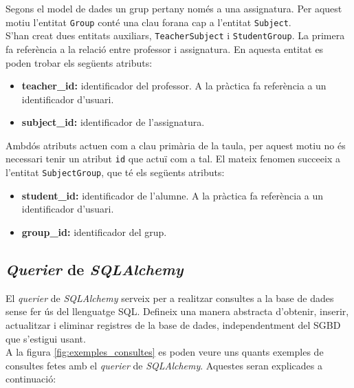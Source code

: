    	Segons el model de dades un grup pertany només a una assignatura. Per aquest motiu l'entitat \texttt{Group} conté una clau forana cap a l'entitat \texttt{Subject}.\\
   	
   	S'han creat dues entitats auxiliars, \texttt{TeacherSubject} i \texttt{StudentGroup}. La primera fa referència a la relació entre professor i assignatura. En aquesta entitat es poden trobar els següents atributs:
   	
   	\begin{itemize}
   		\item \textbf{teacher\_id:} identificador del professor. A la pràctica fa referència a un identificador d'usuari.
   		\item \textbf{subject\_id:} identificador de l'assignatura.
   	\end{itemize}
   	
   	Ambdós atributs actuen com a clau primària de la taula, per aquest motiu no és necessari tenir un atribut \texttt{id} que actuï com a tal. El mateix fenomen succeeix a l'entitat \texttt{SubjectGroup}, que té els següents atributs:
   	
   	\begin{itemize}
   		\item \textbf{student\_id:} identificador de l'alumne. A la pràctica fa referència a un identificador d'usuari.
   		\item \textbf{group\_id:} identificador del grup.
   	\end{itemize}
   	   
   \subsection{\emph{Querier} de \emph{SQLAlchemy}}
   
   El \emph{querier} de \emph{SQLAlchemy} serveix per a realitzar consultes a la base de dades sense fer ús del llenguatge \ac{SQL}. Defineix una manera abstracta d'obtenir, inserir, actualitzar i eliminar registres de la base de dades, independentment del \ac{SGBD} que s'estigui usant. \\
  
	A la figura \ref{fig:exemples_consultes} es poden veure uns quants exemples de consultes fetes amb el \emph{querier} de \emph{SQLAlchemy}. Aquestes seran explicades a continuació:

